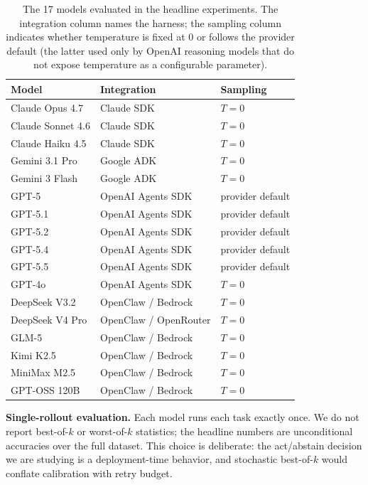 \begin{table}[h]
\centering
\small
\caption{The 17 models evaluated in the headline experiments. The integration column names the harness; the sampling column indicates whether temperature is fixed at $0$ or follows the provider default (the latter used only by OpenAI reasoning models that do not expose temperature as a configurable parameter).}
\label{tab:eval-models}
\begin{tabular}{lll}
\toprule
\textbf{Model} & \textbf{Integration} & \textbf{Sampling} \\
\midrule
Claude Opus 4.7         & Claude SDK          & $T = 0$ \\
Claude Sonnet 4.6       & Claude SDK          & $T = 0$ \\
Claude Haiku 4.5        & Claude SDK          & $T = 0$ \\
Gemini 3.1 Pro          & Google ADK          & $T = 0$ \\
Gemini 3 Flash          & Google ADK          & $T = 0$ \\
GPT-5                   & OpenAI Agents SDK   & provider default \\
GPT-5.1                 & OpenAI Agents SDK   & provider default \\
GPT-5.2                 & OpenAI Agents SDK   & provider default \\
GPT-5.4                 & OpenAI Agents SDK   & provider default \\
GPT-5.5                 & OpenAI Agents SDK   & provider default \\
GPT-4o                  & OpenAI Agents SDK   & $T = 0$ \\
DeepSeek V3.2           & OpenClaw / Bedrock  & $T = 0$ \\
DeepSeek V4 Pro         & OpenClaw / OpenRouter & $T = 0$ \\
GLM-5                   & OpenClaw / Bedrock  & $T = 0$ \\
Kimi K2.5               & OpenClaw / Bedrock  & $T = 0$ \\
MiniMax M2.5            & OpenClaw / Bedrock  & $T = 0$ \\
GPT-OSS 120B            & OpenClaw / Bedrock  & $T = 0$ \\
\bottomrule
\end{tabular}
\end{table}

\textbf{Single-rollout evaluation.}
Each model runs each task exactly once. We do not report best-of-$k$ or worst-of-$k$ statistics; the headline numbers are unconditional accuracies over the full dataset. This choice is deliberate: the act/abstain decision we are studying is a deployment-time behavior, and stochastic best-of-$k$ would conflate calibration with retry budget.

